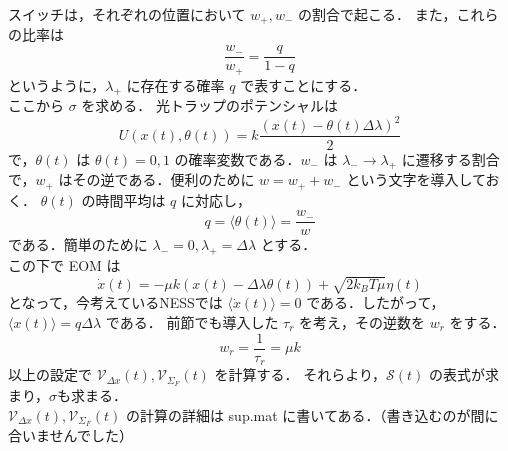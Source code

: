 \documentclass{jsarticle}
\numberwithin{equation}{section}
\theoremstyle{definition}
\newcommand{\ave}[1]{\langle #1 \rangle}
\begin{document}
スイッチは，それぞれの位置において $w_+, w_-$ の割合で起こる．
また，これらの比率は
\begin{equation}
  \frac{w_-}{w_+} = \frac{q}{1-q}
\end{equation}
というように，$\lambda_+$ に存在する確率 $q$ で表すことにする．\\
\quad ここから $\sigma$ を求める．
光トラップのポテンシャルは
\begin{equation}
  U(x(t), \theta(t)) = k \frac{(x(t) - \theta(t) \Delta \lambda)^2}{2}
\end{equation}
で，$\theta (t)$ は $\theta (t) = {0, 1}$ の確率変数である．$w_-$ は $\lambda_- \to \lambda_+$ に遷移する割合で，$w_+$ はその逆である．便利のために $w = w_+ + w_-$ という文字を導入しておく．
$\theta (t)$ の時間平均は $q$ に対応し，
\begin{equation}
  q = \ave{\theta(t)} = \frac{w_-}{w}
\end{equation}
である．簡単のために $\lambda_- = 0, \lambda_+ = \Delta \lambda$ とする．\\
\quad この下で EOM は
\begin{equation}
  \dot{x} (t) = - \mu k (x(t) - \Delta \lambda \theta (t)) + \sqrt{2 k_B T \mu} \eta(t)
\end{equation}
となって，今考えているNESSでは $\ave{\dot{x}(t)} = 0$ である．したがって，$\ave{x(t)} = q \Delta \lambda$ である．
前節でも導入した $\tau_r$ を考え，その逆数を $w_r$ をする．
\begin{equation}
  w_r = \frac{1}{\tau_r} = \mu k
\end{equation}
\quad 以上の設定で $\mathcal{V} _{\Delta x} (t), \mathcal{V} _{\Sigma_F} (t)$ を計算する．
それらより，$\mathcal{S} (t)$ の表式が求まり，$\sigma $も求まる．\\
\quad $\mathcal{V} _{\Delta x} (t), \mathcal{V} _{\Sigma_F} (t)$ の計算の詳細は sup.mat に書いてある．（書き込むのが間に合いませんでした）
\end{document}
